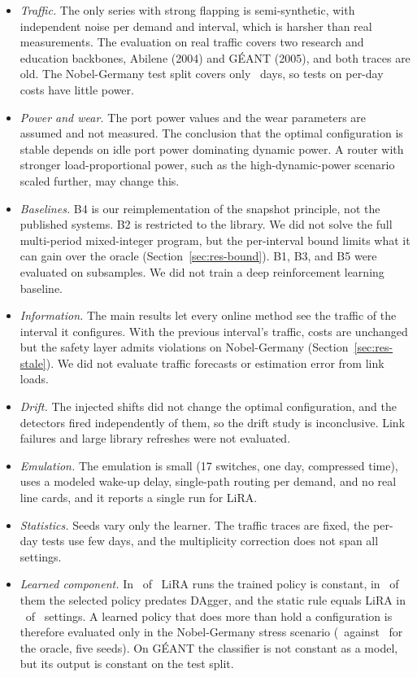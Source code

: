\documentclass[journal]{IEEEtran}
\begin{document}
\begin{itemize}
\item \emph{Traffic.} The only series with strong flapping is semi-synthetic, with independent noise per demand and interval, which is harsher than real measurements. The evaluation on real traffic covers two research and education backbones, Abilene (2004) and G\'{E}ANT (2005), and both traces are old. The Nobel-Germany test split covers only \nobTestDays\ days, so tests on per-day costs have little power.
\item \emph{Power and wear.} The port power values and the wear parameters are assumed and not measured. The conclusion that the optimal configuration is stable depends on idle port power dominating dynamic power. A router with stronger load-proportional power, such as the high-dynamic-power scenario scaled further, may change this.
\item \emph{Baselines.} B4 is our reimplementation of the snapshot principle, not the published systems. B2 is restricted to the library. We did not solve the full multi-period mixed-integer program, but the per-interval bound limits what it can gain over the oracle (Section~\ref{sec:res-bound}). B1, B3, and B5 were evaluated on subsamples. We did not train a deep reinforcement learning baseline.
\item \emph{Information.} The main results let every online method see the traffic of the interval it configures. With the previous interval's traffic, costs are unchanged but the safety layer admits violations on Nobel-Germany (Section~\ref{sec:res-stale}). We did not evaluate traffic forecasts or estimation error from link loads.
\item \emph{Drift.} The injected shifts did not change the optimal configuration, and the detectors fired independently of them, so the drift study is inconclusive. Link failures and large library refreshes were not evaluated.
\item \emph{Emulation.} The emulation is small (17 switches, one day, compressed time), uses a modeled wake-up delay, single-path routing per demand, and no real line cards, and it reports a single run for LiRA.
\item \emph{Statistics.} Seeds vary only the learner. The traffic traces are fixed, the per-day tests use few days, and the multiplicity correction does not span all settings.
\item \emph{Learned component.} In \liraConstRuns\ of \liraTotalRuns\ LiRA runs the trained policy is constant, in \daggerRoundZero\ of them the selected policy predates DAgger, and the static rule equals LiRA in \staticSame\ of \staticTotal\ settings. A learned policy that does more than hold a configuration is therefore evaluated only in the Nobel-Germany stress scenario (\nobJLiRAst\ against \nobJOst\ for the oracle, five seeds). On G\'{E}ANT the classifier is not constant as a model, but its output is constant on the test split.
\end{itemize}
\end{document}
